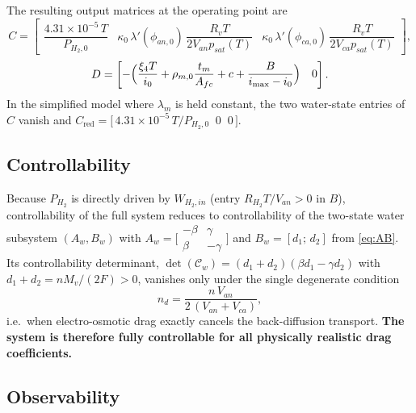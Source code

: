The resulting output matrices at the operating point are
\begin{equation}
    C =
    \begin{bmatrix}
        \dfrac{4.31\times10^{-5}\,T}{P_{H_2,0}} &
        \kappa_0\,\lambda'(\phi_{an,0})\,\dfrac{R_v T}{2V_{an}p_{sat}(T)} &
        \kappa_0\,\lambda'(\phi_{ca,0})\,\dfrac{R_v T}{2V_{ca}p_{sat}(T)}
    \end{bmatrix},
    \label{eq:Cmat}
\end{equation}
\begin{equation}
    D =
    \begin{bmatrix}
        -\Bigl(\dfrac{\xi_4 T}{i_0}
        + \rho_{m,0}\dfrac{t_m}{A_{fc}} + c
        + \dfrac{B}{i_{\max}-i_0}\Bigr) & 0
    \end{bmatrix}.
    \label{eq:Dmat}
\end{equation}
In the simplified model where $\lambda_m$ is held constant, the two water-state
entries of $C$ vanish and
$C_{\text{red}} = \bigl[\,4.31\times10^{-5}\,T/P_{H_2,0}\;\;0\;\;0\,\bigr]$.

\subsection{Controllability}

Because $P_{H_2}$ is directly driven by $W_{H_2,in}$ (entry
$R_{H_2}T/V_{an}>0$ in $B$), controllability of the full system reduces to
controllability of the two-state water subsystem
$(A_w,B_w)$ with
$A_w=\bigl[\begin{smallmatrix}-\beta & \gamma\\ \beta & -\gamma\end{smallmatrix}\bigr]$
and $B_w=[d_1;\,d_2]$ from \eqref{eq:AB}. Its controllability determinant,
$\det(\mathcal{C}_w)=(d_1+d_2)(\beta d_1-\gamma d_2)$ with
$d_1+d_2=nM_v/(2F)>0$, vanishes only under the single degenerate condition
\begin{equation}
    n_d = \frac{n\,V_{an}}{2\,(V_{an}+V_{ca})},
    \label{eq:ctrb-cond}
\end{equation}
i.e.\ when electro-osmotic drag exactly cancels the back-diffusion transport.
\textbf{The system is therefore fully controllable for all physically realistic
drag coefficients.}

\subsection{Observability}

